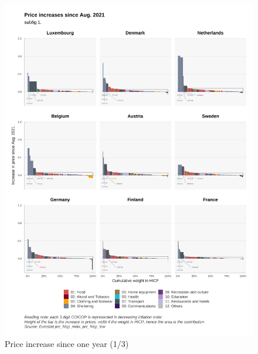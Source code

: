 \documentclass[
  9pt,
  a4paper,
  numbers=noendperiod,
  DIV=12]{scrartcl}
\begin{document}
\begin{figure}

\caption{Price increase since one year (1/3)}

{\centering \includegraphics{../svg/depuis_1y_1.png}

}

\end{figure}
\end{document}

